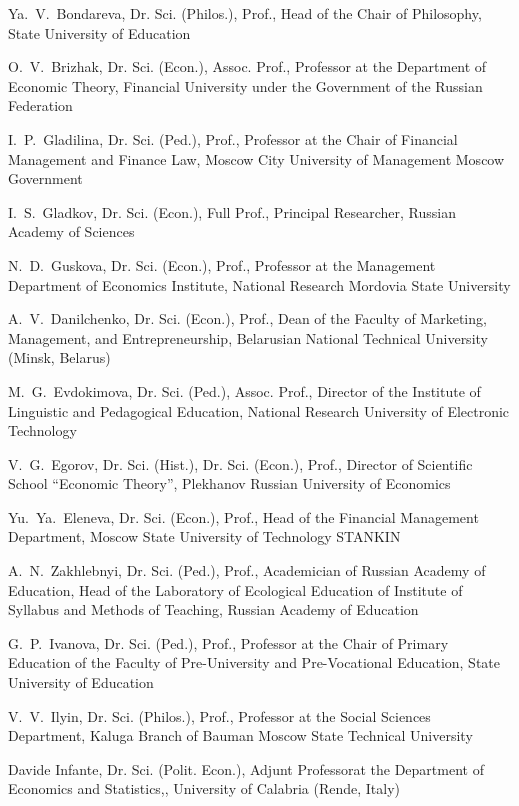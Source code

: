 \begin{otherlanguage}{english}
\begin{multicols}{2}
\noindent Ya. V. Bondareva, Dr. Sci. (Philos.), Prof., Head of the Chair of Philosophy, State University of Education

\noindent O. V. Brizhak, Dr. Sci. (Econ.), Assoc. Prof., Professor at the Department of Economic Theory, Financial University under the Government of the Russian Federation

\noindent I. P. Gladilina, Dr. Sci. (Ped.), Prof., Professor at the Chair of Financial Management and Finance Law, Moscow City University of Management Moscow Government

\noindent I. S. Gladkov, Dr. Sci. (Econ.), Full Prof., Principal Researcher, Russian Academy of Sciences

\noindent N. D. Guskova, Dr. Sci. (Econ.), Prof., Professor at the Management Department of Economics Institute, National Research Mordovia State University

\noindent A. V. Danilchenko, Dr. Sci. (Econ.), Prof., Dean of the Faculty of Marketing, Management, and Entrepreneurship, Belarusian National Technical University (Minsk, Belarus)

\noindent M. G. Evdokimova, Dr. Sci. (Ped.), Assoc. Prof., Director of the Institute of Linguistic and Pedagogical Education, National Research University of Electronic Technology

\noindent V. G. Egorov, Dr. Sci. (Hist.), Dr. Sci. (Econ.), Prof., Director of Scientific School ``Economic Theory'', Plekhanov Russian University of Economics

\noindent Yu. Ya. Eleneva, Dr. Sci. (Econ.), Prof., Head of the Financial Management Department, Moscow State University of Technology STANKIN

\noindent A. N. Zakhlebnyi, Dr. Sci. (Ped.), Prof., Academician of Russian Academy of Education, Head of the Laboratory of Ecological Education of Institute of Syllabus and Methods of Teaching, Russian Academy of Education

\noindent G. P. Ivanova, Dr. Sci. (Ped.), Prof., Professor at the Chair of Primary Education of the Faculty of Pre-University and Pre-Vocational Education, State University of Education

\noindent V. V. Ilyin, Dr. Sci. (Philos.), Prof., Professor at the Social Sciences Department, Kaluga Branch of Bauman Moscow State Technical University

\noindent Davide Infante, Dr. Sci. (Polit. Econ.), Adjunt Professorat the Department of Economics and Statistics,, University of Calabria (Rende, Italy)


\end{multicols}
\end{otherlanguage}
